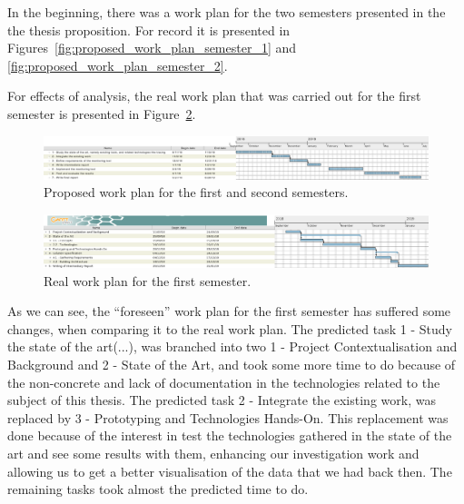 In the beginning, there was a work plan for the two semesters presented in the the thesis proposition. For record it is presented in Figures~\ref{fig:proposed_work_plan_semester_1} and \ref{fig:proposed_work_plan_semester_2}.

For effects of analysis, the real work plan that was carried out for the first semester is presented in Figure~\ref{fig:real_work_plan_semester_1}.

\begin{figure}[H]
    \centering
    \includegraphics[width=1.00\textwidth]{images/proposed_work_plan_semester_1_and_2.pdf}
    \caption{Proposed work plan for the first and second semesters.}
    \label{fig:proposed_work_plan_semester_1_and_2}
\end{figure}

\begin{figure}[H]
    \centering
    \includegraphics[width=1.00\textwidth, height=0.25\textwidth]{images/real_work_plan_semester_1.pdf}
    \caption{Real work plan for the first semester.}
    \label{fig:real_work_plan_semester_1}
\end{figure}

As we can see, the ``foreseen'' work plan for the first semester has suffered some changes, when comparing it to the real work plan. The predicted task 1 - Study the state of the art(...), was branched into two 1 - Project Contextualisation and Background and 2 - State of the Art, and took some more time to do because of the non-concrete and lack of documentation in the technologies related to the subject of this thesis. The predicted task 2 - Integrate the existing work, was replaced by 3 - Prototyping and Technologies Hands-On. This replacement was done because of the interest in test the technologies gathered in the state of the art and see some results with them, enhancing our investigation work and allowing us to get a better visualisation of the data that we had back then. The remaining tasks took almost the predicted time to do.

